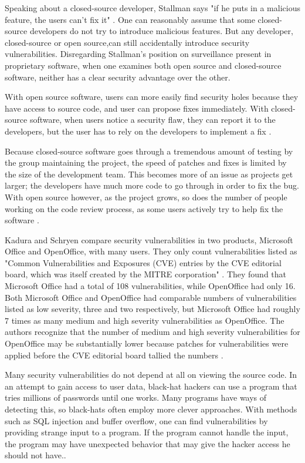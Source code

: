 ﻿Speaking about a closed-source developer, Stallman says "if he puts in a
malicious feature, the users can't fix it" \citeyear[para. 36]{rms2011}.
One can reasonably assume that some closed-source developers do not try
to introduce malicious features. But any developer, closed-source or
open source,can still accidentally introduce security
vulnerabilities. Disregarding Stallman's position on surveillance present in
proprietary software, when one examines both open source and closed-source
software, neither has a clear security advantage over the other.

With open source software, users can more easily find security holes because
they have access to source code, and user can propose fixes immediately.
With closed-source software, when users notice a security flaw, they can report
it to the developers, but the user has to rely on the developers to implement a
fix \cite[para. 17]{kadura}.

Because closed-source software goes through a tremendous amount of testing
by the group maintaining the project, the speed of patches and fixes is limited
by the size of the development team. This becomes more of an issue as projects
get larger; the developers have much more code to go through in order to fix the
bug. With open source however, as the project grows, so does the number of
people working on the code review process, as some users actively try to help
fix the software \cite[p. ~245]{boulanger}.

Kadura and Schryen compare security vulnerabilities in two products, Microsoft
Office and OpenOffice, with many users. They only count vulnerabilities listed
as "Common Vulnerabilities and Exposures (CVE) entries by the CVE editorial
board, which was itself created by the MITRE corporation"
\citeyear{kadura}. They found that Microsoft Office had a total of 108
vulnerabilities, while OpenOffice had only 16. Both Microsoft Office and
OpenOffice had comparable numbers of vulnerabilities listed as low severity,
three and two respectively, but Microsoft Office had roughly 7 times as many
medium and high severity vulnerabilities as OpenOffice. The authors recognize
that the number of medium and high severity vulnerabilities for OpenOffice may
be substantially lower because patches for vulnerabilities were applied before
the CVE editorial board tallied the numbers \cite{kadura}.

Many security vulnerabilities do not depend at all on viewing the source code.
In an attempt to gain access to user data, black-hat hackers can use a program
that tries millions of passwords until one works. Many programs have ways of
detecting this, so black-hats often employ  more clever approaches. With methods
such as SQL injection and buffer overflow, one can find vulnerabilities by
providing strange input to a program. If the program cannot handle the input,
the program may have unexpected behavior that may give the hacker access he
should not have.\cite[p. ~8-9]{clarke}.

